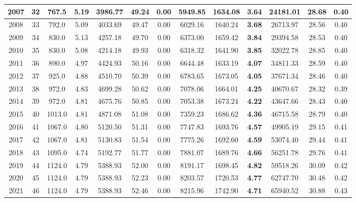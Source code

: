 {\begin{center}
\begin{tabular}[htb]{|c|c||c|c|c|c|c|c||c|c||c|c|c||}
\hline 
 2007 &  32 &  767.5 &  5.19 &  3986.77 &  49.24 &  0.00 &  5949.85 &  1634.08 &  {\bf 3.64} &  24181.01 &  28.68 &  0.40 \\ 
\hline 
 2008 &  33 &  792.0 &  5.09 &  4033.69 &  49.47 &  0.00 &  6029.16 &  1640.24 &  {\bf 3.68} &  26713.97 &  28.56 &  0.40 \\ 
\hline 
 2009 &  34 &  830.0 &  5.13 &  4257.18 &  49.70 &  0.00 &  6373.00 &  1659.42 &  {\bf 3.84} &  29394.58 &  28.53 &  0.40 \\ 
\hline 
 2010 &  35 &  830.0 &  5.08 &  4214.18 &  49.93 &  0.00 &  6318.32 &  1641.90 &  {\bf 3.85} &  32022.78 &  28.85 &  0.40 \\ 
\hline 
 2011 &  36 &  890.0 &  4.97 &  4424.93 &  50.16 &  0.00 &  6644.48 &  1633.19 &  {\bf 4.07} &  34811.33 &  28.59 &  0.40 \\ 
\hline 
 2012 &  37 &  925.0 &  4.88 &  4510.70 &  50.39 &  0.00 &  6783.65 &  1673.05 &  {\bf 4.05} &  37671.34 &  28.46 &  0.40 \\ 
\hline 
 2013 &  38 &  972.0 &  4.83 &  4699.28 &  50.62 &  0.00 &  7078.06 &  1664.01 &  {\bf 4.25} &  40670.67 &  28.32 &  0.39 \\ 
\hline 
 2014 &  39 &  972.0 &  4.81 &  4675.76 &  50.85 &  0.00 &  7053.38 &  1673.24 &  {\bf 4.22} &  43647.66 &  28.43 &  0.40 \\ 
\hline 
 2015 &  40 &  1013.0 &  4.81 &  4871.08 &  51.08 &  0.00 &  7359.23 &  1686.62 &  {\bf 4.36} &  46715.58 &  28.79 &  0.40 \\ 
\hline 
 2016 &  41 &  1067.0 &  4.80 &  5120.50 &  51.31 &  0.00 &  7747.83 &  1693.76 &  {\bf 4.57} &  49905.19 &  29.15 &  0.41 \\ 
\hline 
 2017 &  42 &  1067.0 &  4.81 &  5130.83 &  51.54 &  0.00 &  7775.26 &  1692.60 &  {\bf 4.59} &  53074.40 &  29.44 &  0.41 \\ 
\hline 
 2018 &  43 &  1095.0 &  4.74 &  5192.77 &  51.77 &  0.00 &  7881.07 &  1689.76 &  {\bf 4.66} &  56251.78 &  29.76 &  0.41 \\ 
\hline 
 2019 &  44 &  1124.0 &  4.79 &  5388.93 &  52.00 &  0.00 &  8191.17 &  1698.45 &  {\bf 4.82} &  59518.26 &  30.09 &  0.42 \\ 
\hline 
 2020 &  45 &  1124.0 &  4.79 &  5388.93 &  52.23 &  0.00 &  8203.57 &  1720.53 &  {\bf 4.77} &  62747.70 &  30.48 &  0.42 \\ 
\hline 
 2021 &  46 &  1124.0 &  4.79 &  5388.93 &  52.46 &  0.00 &  8215.96 &  1742.90 &  {\bf 4.71} &  65940.52 &  30.88 &  0.43 \\ 

\end{tabular}
\end{center}}
